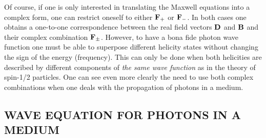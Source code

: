\documentclass{article}
\begin{document}
Of course, if one is only interested in translating the Maxwell equations
into a complex form, one can restrict oneself to either ${\bf F}_+$ or ${\bf
F}_-$. In both cases one obtains a one-to-one correspondence between the
real field vectors ${\bf D}$ and ${\bf B}$ and their complex combination
${\bf F}_{\pm}$. However, to have a bona fide photon wave function one must
be able to superpose different helicity states without changing the sign of
the energy (frequency). This can only be done when both helicities are
described by different components of {\em the same wave function} as in the
theory of spin-1/2 particles. One can see even more clearly the need to use both
complex combinations when one deals with the propagation of photons in a
medium.

\subsection[WAVE EQUATION IN A MEDIUM]{WAVE EQUATION FOR PHOTONS IN A
MEDIUM}
\end{document}

